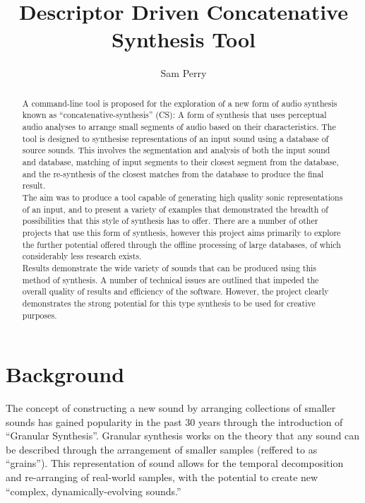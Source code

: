 \documentclass{scrartcl}
\begin{document}
    \title{Descriptor Driven Concatenative Synthesis Tool}
    \author{Sam Perry}

    \maketitle

    \begin{abstract} 
    A command-line tool is proposed for the exploration of a new form of audio
    synthesis known as ``concatenative-synthesis'' (CS): A form of synthesis that uses
    perceptual audio analyses to arrange small segments of audio based on their
    characteristics.  The tool is designed to synthesise representations of an
    input sound using a database of source sounds. This involves the
    segmentation and analysis of both the input sound and database, matching of
    input segments to their closest segment from the database, and the
    re-synthesis of the closest matches from the database to produce the final
    result.\\

    The aim was to produce a tool capable of generating high quality sonic
    representations of an input, and to present a variety of examples that
    demonstrated the breadth of possibilities that this style of synthesis has
    to offer. There are a number of other projects that use this form of
    synthesis, however this project aims primarily to explore the further
    potential offered through the offline processing of large databases, of
    which considerably less research exists.\\

    Results demonstrate the wide variety of sounds that can be produced using
    this method of synthesis. A number of technical issues are outlined that
    impeded the overall quality of results and efficiency of the software.
    However, the project clearly demonstrates the strong potential for this
    type synthesis to be used for creative purposes.
    \end{abstract}

    \section*{Background}
    The concept of constructing a new sound by arranging collections of smaller
    sounds has gained popularity in the past 30 years through the introduction
    of ``Granular Synthesis''. Granular synthesis works on the theory that any
    sound can be described through the arrangement of smaller samples (reffered
    to as ``grains''). This representation of sound allows for the temporal
    decomposition and re-arranging of real-world samples, with the potential to
    create new ``complex, dynamically-evolving
    sounds.''~\parencite[p.1]{Roads1988}\\
\end{document}
